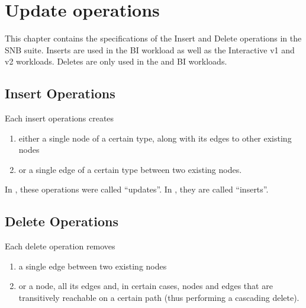 \chapter{Update operations}
\label{sec:update-operations}

This chapter contains the specifications of the Insert and Delete operations in the SNB suite. Inserts are used in the BI workload as well as the Interactive v1 and v2 workloads. Deletes are only used in the \interactivevtwo and BI workloads.

\section{Insert Operations}
\label{sec:insert-operations}

Each insert operations creates

\begin{enumerate}
    \item either a single node of a certain type, along with its edges to other existing nodes
    \item or a single edge of a certain type between two existing nodes.
\end{enumerate}
In \interactivevone, these operations were called ``updates''.
In \interactivevtwo, they are called ``inserts''.



\section{Delete Operations}
\label{sec:delete-operations}

Each delete operation removes

\begin{enumerate}
    \item a single edge between two existing nodes
    \item or a node, all its edges and, in certain cases, nodes and edges that are transitively reachable on a certain path (thus performing a cascading delete).
\end{enumerate}


